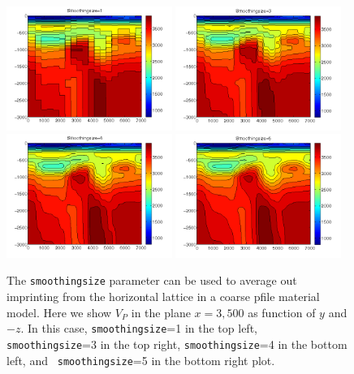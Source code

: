 \documentclass[11pt]{report}
\begin{document}
\begin{figure}
\begin{centering}
  \includegraphics[width=0.48\textwidth]{figures/ps1.png}\hfill
\includegraphics[width=0.48\textwidth]{figures/ps3.png}\\
  \includegraphics[width=0.48\textwidth]{figures/ps4.png}\hfill
\includegraphics[width=0.48\textwidth]{figures/ps5.png} 
  \caption{The {\tt smoothingsize} parameter can be used to average out imprinting from the
    horizontal lattice in a coarse pfile material model. Here we show $V_P$ in the plane $x=3,500$
    as function of $y$ and $-z$. In this case, {\tt smoothingsize}=1 in the top left, {\tt
    smoothingsize}=3 in the top right, {\tt smoothingsize}=4 in the bottom left, and  {\tt
      smoothingsize}=5 in the bottom right plot.}
  \label{fig:pfile-smoothing}
\end{centering}
\end{figure}
\end{document}
